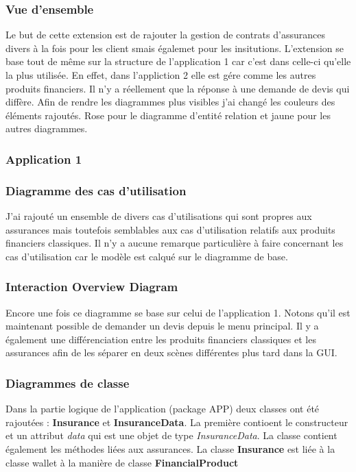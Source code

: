 \documentclass[../rapport.tex]{subfiles}
\begin{document}
		\subsubsection{Vue d'ensemble}
		Le but de cette extension est de rajouter la gestion de contrats d'assurances divers
		à la fois pour les client smais égalemet pour les insitutions. L'extension se base tout
		de même sur la structure de l'application 1 car c'est dans celle-ci qu'elle la plus 
		utilisée. En effet, dans l'appliction 2 elle est gére comme les autres produits 
		financiers. Il n'y a réellement que la réponse à une demande de devis qui diffère.
		Afin de rendre les diagrammes plus visibles j'ai changé les couleurs des éléments rajoutés. 
		Rose pour le diagramme d'entité relation et jaune pour les autres diagrammes.

		\subsubsection{Application 1}

		\subsubsection{Diagramme des cas d'utilisation}

		J'ai rajouté un ensemble de divers cas d'utilisations qui sont propres aux assurances
		mais toutefois semblables aux cas d'utilisation relatifs aux produits financiers
		classiques. Il n'y a aucune remarque particulière à faire concernant les cas
		d'utilisation car le modèle est calqué sur le diagramme de base.

				

		\subsubsection{Interaction Overview Diagram}

		Encore une fois ce diagramme se base sur celui de l'application 1. Notons qu'il est
		maintenant possible de demander un devis depuis le menu principal. Il y a également une 
		différenciation entre les produits financiers classiques et les assurances afin de les 
		séparer en deux scènes différentes plus tard dans la GUI.


		\subsubsection{Diagrammes de classe}

		Dans la partie logique de l'application (package APP) deux classes ont été rajoutées :
		\textbf{Insurance} et \textbf{InsuranceData}. La première contioent le constructeur et 
		un attribut \textit{data} qui est une objet de type \textit{InsuranceData}. La classe 
		contient également les méthodes liées aux assurances. La classe \textbf{Insurance} est
		liée à la classe wallet à la manière de classe \textbf{FinancialProduct}
\end{document}
